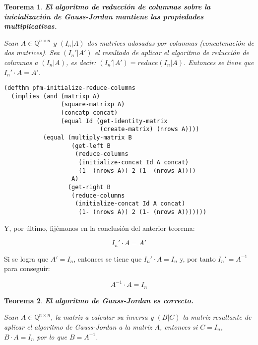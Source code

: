 \documentclass[a4paper,10pt]{article}
\newcommand{\M}[3]{#1 \in \mathbb{Q}^{#2 \times #3}}
\newtheorem{teor}{{Teorema}}
\begin{document}
\par \vspace{16pt}

\begin{teor} \textbf{El algoritmo de reducción de columnas sobre la inicialización de Gauss-Jordan mantiene las propiedades multiplicativas.}\vspace{8pt}\par
Sean $\M{A}{n}{n}$ y $(I_n|A)$ dos matrices adosadas por columnas (concatenación de dos matrices). Sea $(I_n'|A')$ el resultado de aplicar el algoritmo de reducción de columnas a $(I_n|A)$, es decir: $(I_n'|A') = reduce(I_n|A)$. Entonces se tiene que $I_n'\cdot A = A'$.
\end{teor}

\begin{lstlisting}[language=clips]
(defthm pfm-initialize-reduce-columns
  (implies (and (matrixp A)
                (square-matrixp A)
                (concatp concat)
                (equal Id (get-identity-matrix 
                           (create-matrix) (nrows A))))
           (equal (multiply-matrix B 
                   (get-left B 
                    (reduce-columns 
                     (initialize-concat Id A concat) 
                     (1- (nrows A)) 2 (1- (nrows A)))) 
                   A)
                  (get-right B 
                   (reduce-columns 
                    (initialize-concat Id A concat) 
                     (1- (nrows A)) 2 (1- (nrows A)))))))
\end{lstlisting}

\par \vspace{16pt}

Y, por último, fijémonos en la conclusión del anterior teorema:

$$
I_n'\cdot A = A'
$$

\par \vspace{10pt}

Si se logra que $A' = I_n$, entonces se tiene que $I_n'\cdot A = I_n$ y, por tanto $I_n'=A^{-1}$ para conseguir:

$$
A^{-1}\cdot A = I_n
$$

\par \vspace{16pt}

\begin{teor} \textbf{El algoritmo de Gauss-Jordan es correcto.}\vspace{8pt}\par
Sean $\M{A}{n}{n}$, la matriz a calcular su inversa y $(B|C)$ la matriz resultante de aplicar el algoritmo de Gauss-Jordan a la matriz $A$, entonces si $C=I_n$, $B\cdot A = I_n$ por lo que $B=A^{-1}$.
\end{teor}
\end{document}
